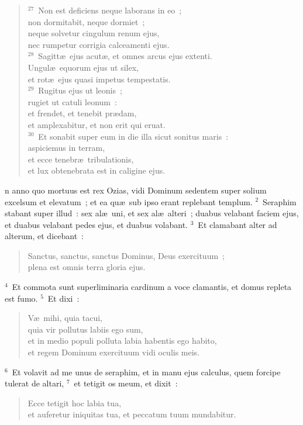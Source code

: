 \begin{verse}
${}^{27}$~Non est deficiens neque laborans in eo~;\\ non dormitabit, neque dormiet~;\\ neque solvetur cingulum renum ejus,\\ nec rumpetur corrigia calceamenti ejus.\\
${}^{28}$~Sagitt\ae\ ejus acut\ae , et omnes arcus ejus extenti.\\ Ungul\ae\ equorum ejus ut silex,\\ et rot\ae\ ejus quasi impetus tempestatis.\\
${}^{29}$~Rugitus ejus ut leonis~;\\ rugiet ut catuli leonum~:\\ et frendet, et tenebit pr\ae dam,\\ et amplexabitur, et non erit qui eruat.\\
${}^{30}$~Et sonabit super eum in die illa sicut sonitus maris~:\\ aspiciemus in terram,\\ et ecce tenebr\ae\ tribulationis,\\ et lux obtenebrata est in caligine ejus.\end{verse}



\bchapter
{}n anno quo mortuus est rex Ozias, vidi Dominum sedentem super solium excelsum et elevatum~; et ea qu\ae\ sub ipso erant replebant templum.
${}^{2}$~Seraphim stabant super illud~: sex al\ae\ uni, et sex al\ae\ alteri~; duabus velabant faciem ejus, et duabus velabant pedes ejus, et duabus volabant.
${}^{3}$~Et clamabant alter ad alterum, et dicebant~: \begin{verse}Sanctus, sanctus, sanctus Dominus, Deus exercituum~;\\ plena est omnis terra gloria ejus.\end{verse}


${}^{4}$~Et commota sunt superliminaria cardinum a voce clamantis, et domus repleta est fumo.
${}^{5}$~Et dixi~: \begin{verse}V\ae\ mihi, quia tacui,\\ quia vir pollutus labiis ego sum,\\ et in medio populi polluta labia habentis ego habito,\\ et regem Dominum exercituum vidi oculis meis.\end{verse}


${}^{6}$~Et volavit ad me unus de seraphim, et in manu ejus calculus, quem forcipe tulerat de altari,
${}^{7}$~et tetigit os meum, et dixit~: \begin{verse}Ecce tetigit hoc labia tua,\\ et auferetur iniquitas tua, et peccatum tuum mundabitur.\end{verse}


